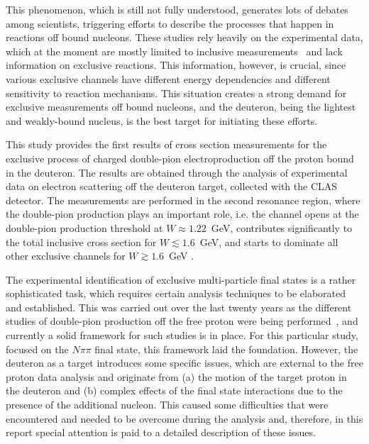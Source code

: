 

This phenomenon, which is still not fully understood, generates lots of debates among scientists, triggering efforts to describe the processes that happen in reactions off bound nucleons. These studies rely heavily on the experimental data, which at the moment are mostly limited to inclusive measurements~\cite{Mokeev:1995fy,Bianchi:1994ax,Ahrens:1986hn,Osipenko_2005_note,Osipenko:2005gt,Osipenko:2010sb} and lack information on exclusive reactions. This information, however, is crucial, since various exclusive channels have different energy dependencies and different sensitivity to reaction mechanisms. This situation creates a strong demand for exclusive measurements off bound nucleons, and the deuteron, being the lightest and weakly-bound nucleus, is the best target for initiating these efforts.

This study provides the first results of cross section measurements for the exclusive process of charged double-pion electroproduction off the proton bound in the deuteron. The results are obtained through the analysis of experimental data on electron scattering off the deuteron target, collected with the CLAS detector. The measurements are performed in the second resonance region, where the double-pion production plays an important role, i.e. the channel opens at the double-pion production threshold at $W \approx 1.22$~GeV, contributes significantly to the total inclusive cross section for $W \lesssim 1.6$~GeV, and starts to dominate all other exclusive channels for $W \gtrsim 1.6$~GeV .


The experimental identification of exclusive multi-particle final states is a rather sophisticated task, which requires certain analysis techniques to be elaborated and established. This was carried out over the last twenty years as the different studies of double-pion production off the free proton were being performed~\cite{Rip_an_note:2002,Ripani:2002ss,Fed_an_note:2007,Fedotov:2008aa,Isupov:2017lnd,Golovach,Arjun,Fed_an_note:2017,Fed_paper_2018}, and currently a solid framework for such studies is in place. For this particular study, focused on the $N\pi\pi$ final state, this framework laid the foundation. However, the deuteron as a target introduces some specific issues, which are external to the free proton data analysis and originate from (a) the motion of the target proton in the deuteron and (b) complex effects of the final state interactions due to the presence of the additional nucleon. This caused some difficulties that were encountered and needed to be overcome during the analysis and, therefore, in this report special attention is paid to a detailed description of these issues.

